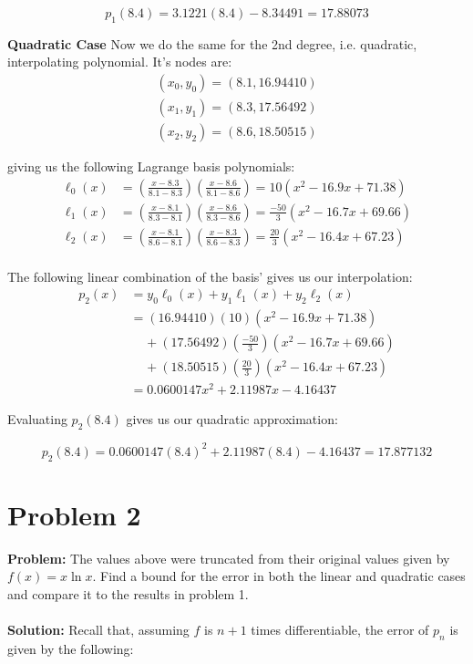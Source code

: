 \documentclass{article}
\begin{document}
$$p_1(8.4)=3.1221(8.4) - 8.34491=\boxed{17.88073}$$

\textbf{Quadratic Case}
Now we do the same for the 2nd degree, i.e. quadratic, interpolating polynomial. It's nodes are:
\begin{gather*}
  (x_0,y_0)=(8.1,16.94410)\\
  (x_1,y_1)=(8.3,17.56492)\\
  (x_2,y_2)=(8.6,18.50515)
\end{gather*}

giving us the following Lagrange basis polynomials:
\begin{align*}
  \ell_0(x)&=\left(\frac{x-8.3}{8.1-8.3}\right)\left(\frac{x-8.6}{8.1-8.6}\right)=10(x^2-16.9x+71.38)\\
  \ell_1(x)&=\left(\frac{x-8.1}{8.3-8.1}\right)\left(\frac{x-8.6}{8.3-8.6}\right)=\frac{-50}{3}(x^2-16.7x+69.66)\\
  \ell_2(x)&=\left(\frac{x-8.1}{8.6-8.1}\right)\left(\frac{x-8.3}{8.6-8.3}\right)=\frac{20}{3}(x^2-16.4x+67.23)\\
\end{align*}

The following linear combination of the basis' gives us our interpolation:
\begin{align*}
  p_2(x)&=y_0\ell_0(x)+y_1\ell_1(x)+y_2\ell_2(x)\\
  &=(16.94410)(10)(x^2-16.9x+71.38)\\
  &\ \ \ \ \ +(17.56492)\left(\frac{-50}{3}\right)(x^2-16.7x+69.66)\\
  &\ \ \ \ \ +(18.50515)\left(\frac{20}{3}\right)(x^2-16.4x+67.23)\\
  &=0.0600147x^2+2.11987x-4.16437
\end{align*}

Evaluating $p_2(8.4)$ gives us our quadratic approximation:

$$p_2(8.4)=0.0600147(8.4)^2+2.11987(8.4)-4.16437=\boxed{17.877132}$$

\section*{Problem 2}
\textbf{Problem:} The values above were truncated from their original values given by $f(x)=x\ln x$. Find a bound for the error in both the linear and quadratic cases and compare it to the results in problem 1.
\\\\
\textbf{Solution:} Recall that, assuming $f$ is $n+1$ times differentiable, the error of $p_n$ is given by the following:
\end{document}

